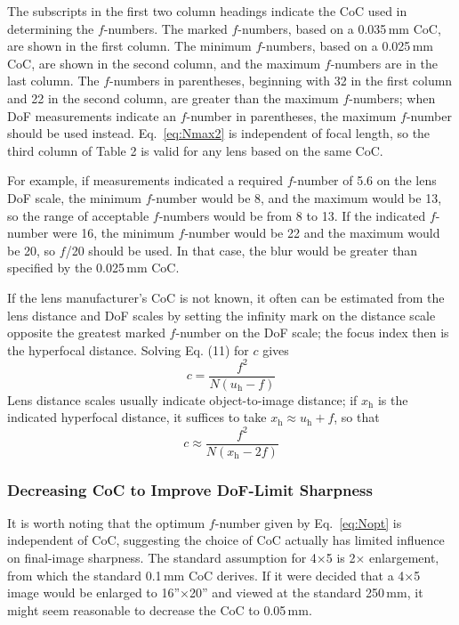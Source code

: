 \documentclass[11pt, oneside]{scrartcl}   	%
\begin{document}
The subscripts in the first two column headings indicate the CoC used in determining the $f$-numbers. The marked $f$-numbers, based on a 0.035\,mm CoC, are shown in the first column. The minimum $f$-numbers, based on a 0.025\,mm CoC, are shown in the second column, and the maximum $f$-numbers are in the last column. The $f$-numbers in parentheses, beginning with 32 in the first column and 22 in the second column, are greater than the maximum $f$-numbers; when DoF measurements indicate an $f$-number in parentheses, the maximum $f$-number should be used instead. Eq.~\ref{eq:Nmax2} is independent of focal length, so the third column of Table 2 is valid for any lens based on the same CoC.

For example, if measurements indicated a required $f$-number of 5.6 on the lens DoF scale, the minimum $f$-number would be 8, and the maximum would be 13, so the range of acceptable $f$-numbers would be from 8 to 13. If the indicated $f$-number were 16, the minimum $f$-number would be 22 and the maximum would be 20, so $f$/20 should be used. In that case, the blur would be greater than specified by the 0.025\,mm CoC.

If the lens manufacturer’s CoC is not known, it often can be estimated from the lens distance and DoF scales by setting the infinity mark on the distance scale opposite the greatest marked $f$-number on the DoF scale; the focus index then is the hyperfocal distance. Solving Eq. (11) for $c$ gives
\begin{equation}
c=\frac{f^2}{N(u_\mathrm{h}-f)}
\end{equation}
Lens distance scales usually indicate object-to-image distance; if $x_\mathrm{h}$ is the indicated hyperfocal distance, it suffices to take $x_\mathrm{h} ≈ u_\mathrm{h} + f$, so that
\begin{equation}
c\approx \frac{f^2}{N(x_\mathrm{h}-2f)}
    \label{eq:capprox}
\end{equation}

\subsubsection{Decreasing CoC to Improve DoF-Limit Sharpness}

It is worth noting that the optimum $f$-number given by Eq.~\ref{eq:Nopt} is independent of CoC, suggesting the choice of CoC actually has limited influence on final-image sharpness. The standard assumption for 4×5 is 2× enlargement, from which the standard 0.1\,mm CoC derives. If it were decided that a 4×5 image would be enlarged to 16''×20'' and viewed at the standard 250\,mm, it might seem reasonable to decrease the CoC to 0.05\,mm.
\end{document}
